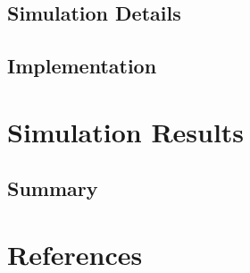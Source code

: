 \documentclass{article}
\begin{document}
\subsection{Simulation Details}

\subsection{Implementation}

\section{Simulation Results}

\subsection{Summary}

\section{References}
\end{document}
